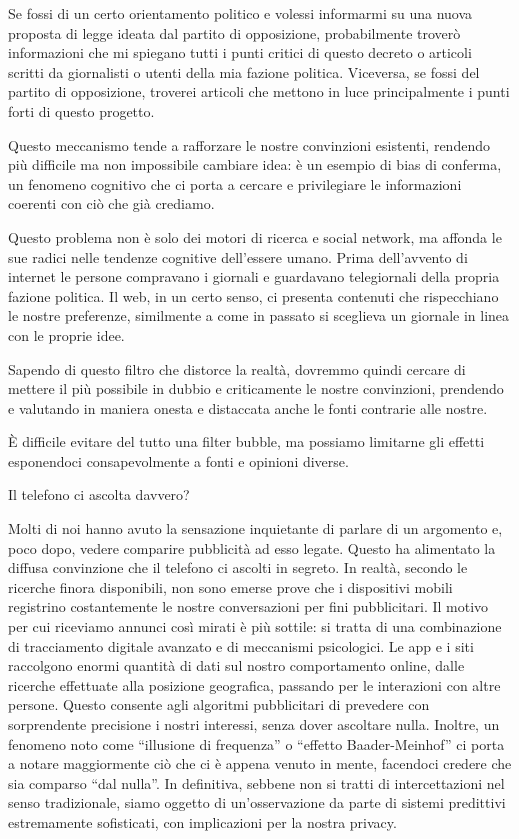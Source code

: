\documentclass[12pt]{book} %
\begin{document}
Se fossi di un certo orientamento politico e volessi informarmi su una nuova proposta di legge ideata dal partito di
opposizione, probabilmente troverò informazioni che mi spiegano tutti i punti critici di questo decreto o articoli
scritti da giornalisti o utenti della mia fazione politica. Viceversa, se fossi del partito di opposizione, troverei
articoli che mettono in luce principalmente i punti forti di questo progetto.

Questo meccanismo tende a rafforzare le nostre convinzioni esistenti, rendendo più difficile ma non impossibile cambiare idea: è un esempio di bias di conferma, un fenomeno cognitivo che ci porta a cercare e privilegiare le informazioni coerenti con ciò che già crediamo.

Questo problema non è solo dei motori di ricerca e social network, ma affonda le sue radici nelle tendenze cognitive dell'essere umano. Prima dell'avvento di internet le persone compravano i
giornali e guardavano telegiornali della propria fazione politica. Il web, in un certo senso, ci presenta contenuti che rispecchiano le nostre preferenze, similmente a come in passato si sceglieva un giornale in linea con le proprie idee.

Sapendo di questo filtro che distorce la realtà, dovremmo quindi cercare di mettere il più possibile in dubbio e criticamente le
nostre convinzioni, prendendo e valutando in maniera onesta e distaccata anche le fonti contrarie alle nostre.

È difficile evitare del tutto una filter bubble, ma possiamo limitarne gli effetti esponendoci consapevolmente a fonti e opinioni diverse.

\begin{mdframed}[linewidth=1pt]
Il telefono ci ascolta davvero?

Molti di noi hanno avuto la sensazione inquietante di parlare di un argomento e, poco dopo, vedere comparire pubblicità ad esso legate. Questo ha alimentato la diffusa convinzione che il telefono ci ascolti in segreto. In realtà, secondo le ricerche finora disponibili, non sono emerse prove che i dispositivi mobili registrino costantemente le nostre conversazioni per fini pubblicitari. Il motivo per cui riceviamo annunci così mirati è più sottile: si tratta di una combinazione di tracciamento digitale avanzato e di meccanismi psicologici. Le app e i siti raccolgono enormi quantità di dati sul nostro comportamento online, dalle ricerche effettuate alla posizione geografica, passando per le interazioni con altre persone. Questo consente agli algoritmi pubblicitari di prevedere con sorprendente precisione i nostri interessi, senza dover ascoltare nulla. Inoltre, un fenomeno noto come “illusione di frequenza” o “effetto Baader-Meinhof” ci porta a notare maggiormente ciò che ci è appena venuto in mente, facendoci credere che sia comparso “dal nulla”. In definitiva, sebbene non si tratti di intercettazioni nel senso tradizionale, siamo oggetto di un'osservazione da parte di sistemi predittivi estremamente sofisticati, con implicazioni per la nostra privacy.
\end{mdframed}
\end{document}
